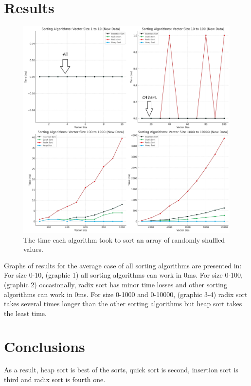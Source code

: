\documentclass{article}
\begin{document}
\section{Results}

\begin{figure}[h]
\centering
\includegraphics[width=1\linewidth,height=0.6\textheight]{../paper/full.png}
\caption* {The time each algorithm took to sort an array of randomly shuffled values.}
\end{figure}

Graphs of results for the average case of all sorting algorithms are presented in:
For size 0-10, (graphic 1) all sorting algorithms can work in 0ms.
For size 0-100, (graphic 2) occasionally, radix sort has minor time losses and other sorting algorithms can work in 0ms.
For size 0-1000 and 0-10000, (graphic 3-4) radix sort takes several times longer than the other sorting algorithms but heap sort takes the least time.

\section{Conclusions}

As a result, heap sort is best of the sorts, quick sort is second, insertion sort is third and radix sort is fourth one.
\end{document}
